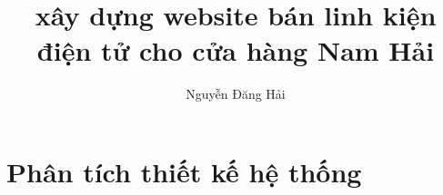 \documentclass[14pt, a4paper]{extreport}
\title{xây dựng website bán linh kiện điện tử cho cửa hàng Nam Hải}
\author{Nguyễn Đăng Hải}
\begin{document}
\maketitle
    \pagestyle{fancyplain}
    \cfoot[]{}
    \tableofcontents

    \clearHeading
    

    \clearHeading
    
    \chapter{Phân tích thiết kế hệ thống}
\end{document}
